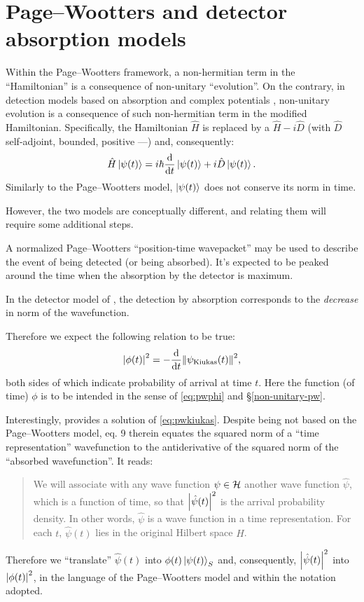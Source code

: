 \section{Page--Wootters and detector absorption models}\label{sec:absorption+pw}

Within the Page--Wootters framework, a non-hermitian term in the ``Hamiltonian''
is a consequence of non-unitary ``evolution''.
On the contrary, in detection models based on absorption and complex potentials
\parencite{RuschhauptAbsorption}, non-unitary evolution is a consequence
of such non-hermitian term in the modified Hamiltonian.
Specifically, the Hamiltonian $\hat{H}$ is replaced by a $\hat{H} - i\hat{D}$
(with $\hat{D}$ self-adjoint, bounded, positive ---\cite{RuschhauptAbsorption})
and, consequently:
\begin{equation}\label{eq:schrod_complex_pot}
  \hat{H} \ket{\psi(t)} = i\hbar\dv{t}\ket{\psi(t)} +i\hat{D}\ket{\psi(t)} \text{.}
\end{equation}
Similarly to the Page--Wootters model, $\ket{\psi(t)}$ does not conserve its norm in time.

However, the two models are conceptually different, and relating them will require some additional steps.

A normalized Page--Wootters ``position-time wavepacket'' may be used to describe the event
of being detected (or being absorbed). It's expected to be peaked around the time when
the absorption by the detector is maximum.

In the detector model of \cite{RuschhauptAbsorption}, the detection
by absorption
corresponds to the \emph{decrease} in norm of the wavefunction.

Therefore we expect the following relation to be true:
\begin{equation}\label{eq:pwkiukas}
  \abs{\phi(t)}^2 = -\dv{t}\norm{\psi_{\text{Kiukas}}(t)}^2 \text{,}
\end{equation}
both sides of which indicate probability of arrival at time $t$.
Here the function (of time) $\phi$ is to be intended in the sense of
\eqref{eq:pwphi} and \S \ref{non-unitary-pw}.

Interestingly, \cite{RuschhauptAbsorption} provides a solution of \eqref{eq:pwkiukas}.
Despite being not based on the Page--Wootters model, eq. 9 therein
equates the squared norm of a ``time representation'' wavefunction
to the antiderivative of the squared norm of the ``absorbed wavefunction''.
It reads:
\begin{quote}
  We will associate with any wave function $\psi \in \mathcal{H}$
  another wave function $\hat{\psi}$,
  which is a function of time, so that
  $\abs{\hat{\psi}(t)}^2$
  is the arrival probability density. In other words,
  $\hat{\psi}$ is a wave function in a time representation. For each
  $t$, $\hat{\psi}(t)$ lies in the original Hilbert space $H$.
\end{quote}
Therefore we ``translate'' $\hat{\psi}(t)$ into $\phi(t)\ket{\psi(t)}_S$
and, consequently, $\abs{\hat{\psi}(t)}^2$ into $\abs{\phi(t)}^2$,
in the language of the Page--Wootters model and within the notation
adopted.

